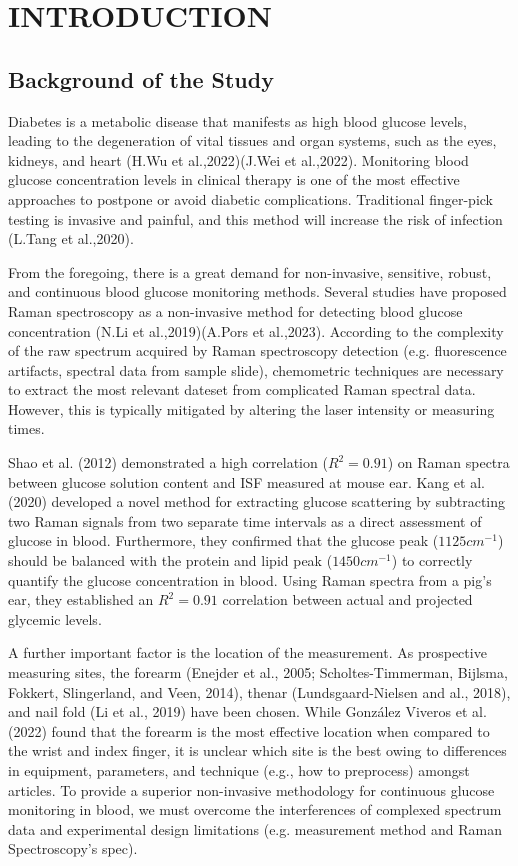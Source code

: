 \chapter{INTRODUCTION} 

\section{Background of the Study}

Diabetes is a metabolic disease that manifests as high blood glucose levels, leading to the degeneration of vital tissues and organ systems, such as the eyes, kidneys, and heart (H.Wu et al.,2022)(J.Wei et al.,2022). 
Monitoring blood glucose concentration levels in clinical therapy is one of the most effective approaches to postpone or avoid diabetic complications. 
Traditional finger-pick testing is invasive and painful, and this method will increase the risk of infection (L.Tang et al.,2020). 

From the foregoing, there is a great demand for non-invasive, sensitive, robust, and continuous blood glucose monitoring methods. 
Several studies have proposed Raman spectroscopy as a non-invasive method for detecting blood glucose concentration (N.Li et al.,2019)(A.Pors et al.,2023). 
According to the complexity of the raw spectrum acquired by Raman spectroscopy detection (e.g. fluorescence artifacts, spectral data from sample slide), chemometric techniques are necessary to extract the most relevant dateset from complicated Raman spectral data. 
However, this is typically mitigated by altering the laser intensity or measuring times.

Shao et al. (2012) demonstrated a high correlation ($R^2 = 0.91$) on Raman spectra between glucose solution content and ISF measured at mouse ear. 
Kang et al. (2020) developed a novel method for extracting glucose scattering by subtracting two Raman signals from two separate time intervals as a direct assessment of glucose in blood. 
Furthermore, they confirmed that the glucose peak ($1125cm^{-1}$) should be balanced with the protein and lipid peak ($1450cm^{-1}$) to correctly quantify the glucose concentration in blood. 
Using Raman spectra from a pig's ear, they established an $R^2 = 0.91$ correlation between actual and projected glycemic levels.

A further important factor is the location of the measurement. 
As prospective measuring sites, the forearm (Enejder et al., 2005; Scholtes-Timmerman, Bijlsma, Fokkert, Slingerland, and Veen, 2014), thenar (Lundsgaard-Nielsen and al., 2018), and nail fold (Li et al., 2019) have been chosen. 
While González Viveros et al. (2022) found that the forearm is the most effective location when compared to the wrist and index finger, it is unclear which site is the best owing to differences in equipment, parameters, and technique (e.g., how to preprocess) amongst articles. 
To provide a superior non-invasive methodology for continuous glucose monitoring in blood, we must overcome the interferences of complexed spectrum data and experimental design limitations (e.g. measurement method and Raman Spectroscopy's spec).

